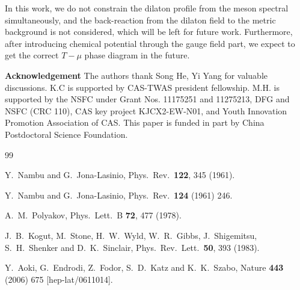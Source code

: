 \documentclass[aps,prd,showpacs,preprintnumbers,twocolumn]{revtex4}
\begin{document}
In this work, we do not constrain the dilaton profile from the meson spectral simultaneously, and the back-reaction from the dilaton field
to the metric background is not considered,  which will be left for future work. Furthermore, after introducing chemical potential through
the gauge field part, we expect to get the correct $T-\mu$ phase diagram in the future.


\vskip 0.5cm
{\bf Acknowledgement}
\vskip 0.2cm
The authors thank Song He, Yi Yang for valuable discussions. K.C is supported by CAS-TWAS president fellowship.
M.H. is supported by the NSFC under Grant Nos. 11175251 and 11275213, DFG and NSFC (CRC 110),
CAS key project KJCX2-EW-N01, and Youth Innovation Promotion Association of CAS. This paper is funded in part by China Postdoctoral Science Foundation.

\begin{thebibliography}{99}

  Y.~Nambu and G.~Jona-Lasinio,
  Phys.\ Rev.\  {\bf 122}, 345 (1961).

  Y.~Nambu and G.~Jona-Lasinio,
  Phys.\ Rev.\  {\bf 124} (1961) 246.

  A.~M.~Polyakov,
  Phys.\ Lett.\  B {\bf 72}, 477 (1978).

  J.~B.~Kogut, M.~Stone, H.~W.~Wyld, W.~R.~Gibbs, J.~Shigemitsu, S.~H.~Shenker and D.~K.~Sinclair,
  Phys.\ Rev.\ Lett.\  {\bf 50}, 393 (1983).

  Y.~Aoki, G.~Endrodi, Z.~Fodor, S.~D.~Katz and K.~K.~Szabo,
  Nature {\bf 443} (2006) 675
  [hep-lat/0611014].



\end{thebibliography}
\end{document}
